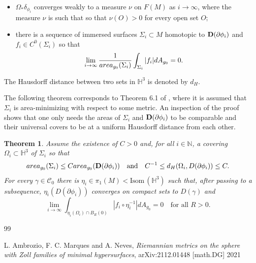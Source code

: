\documentclass[11pt]{amsart}
\def\H{\mathbb H}
\def\N{\mathbb N}
\newtheorem{thm}{Theorem}[section]
\theoremstyle{remark}
\theoremstyle{definition}
\begin{document}
{{	\begin{itemize}
		\item $\Omega_*\delta_{\phi_i}$ converges weakly to a measure $\nu$ on $F(M)$ as $i\to\infty$, where the measure $\nu$ is such that  so that $\nu(O)>0$ for every open set $O$;
		\medskip
		
		\item there is  a sequence of  immersed surfaces $\Sigma_i\subset M$  homotopic to ${\bf D}(\partial \phi_i)$ and $f_i\in C^0(\Sigma_i)$ so that  
		$$\lim_{i\to\infty}\frac{1}{{\rm area}_{g_0}(\Sigma_i)}\int_{\Sigma_i}|f_i|dA_{g_0}=0.$$
	\end{itemize}
	The Hausdorff distance between two sets in $\H^3$ is denoted by $d_H$.
	
	The following theorem corresponds to  Theorem 6.1 of \cite{cal-marques-neves}, where it is assumed that   $\Sigma_i$ is  area-minimizing with respect to some metric. An inspection of the proof shows that one only needs  the areas of $\Sigma_i$ and ${\bf D}(\partial \phi_i)$ to be  comparable and their universal covers to be at a uniform Hausdorff distance from each other.
	\begin{thm}\label{CMN.thm} Assume the existence of $C>0$ and, for all $i\in\N$, a covering $\Omega_i\subset\H^3$ of $\Sigma_i$ so that
		$${\rm area}_{g_0}(\Sigma_i)\leq C{\rm area}_{g_0}({\bf D}(\partial \phi_i))\quad\mbox{and}\quad
		C^{-1}\leq d_H(\Omega_i,D(\partial \phi_i))\leq C.$$
		For every $\gamma\in \mathcal C_0$ there is $\eta_i\in \pi_1(M)<\text{Isom}\,(\H^3)$ such that, after passing to a subsequence, $\eta_i(D(\partial \phi_i))$ converges on compact sets to $D(\gamma)$ and 
		$$\lim_{i\to\infty}\int_{\eta_i(\Omega_i)\cap B_R(0)}|f_i\circ\eta_i^{-1}|dA_{g_0}=0\quad\mbox{for all }R>0.$$
	\end{thm}
	
	
	
	
	
	
	
	
	
	\begin{thebibliography}{99}
		
		 {L.  Ambrozio, F. C. Marques and A. Neves}, {\em Riemannian metrics on the sphere with Zoll families of minimal hypersurfaces}, arXiv:2112.01448 [math.DG] 2021
		

\end{thebibliography}}}
\end{document}

